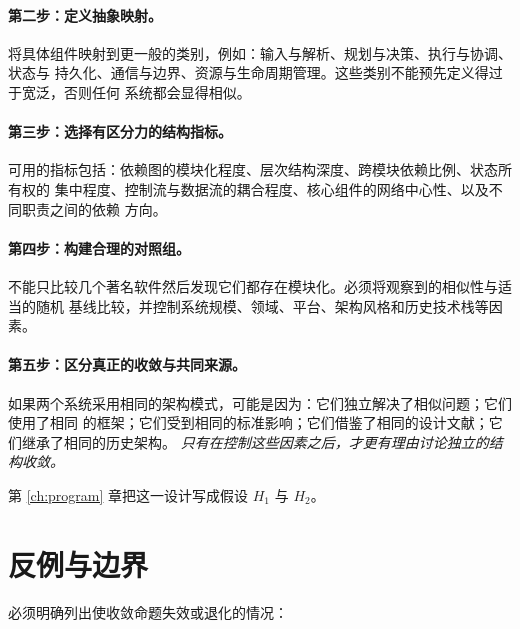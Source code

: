 \paragraph{第二步：定义抽象映射。}
将具体组件映射到更一般的类别，例如：输入与解析、规划与决策、执行与协调、状态与
持久化、通信与边界、资源与生命周期管理。这些类别不能预先定义得过于宽泛，否则任何
系统都会显得相似。

\paragraph{第三步：选择有区分力的结构指标。}
可用的指标包括：依赖图的模块化程度、层次结构深度、跨模块依赖比例、状态所有权的
集中程度、控制流与数据流的耦合程度、核心组件的网络中心性、以及不同职责之间的依赖
方向。

\paragraph{第四步：构建合理的对照组。}
不能只比较几个著名软件然后发现它们都存在模块化。必须将观察到的相似性与适当的随机
基线比较，并控制系统规模、领域、平台、架构风格和历史技术栈等因素。

\paragraph{第五步：区分真正的收敛与共同来源。}
如果两个系统采用相同的架构模式，可能是因为：它们独立解决了相似问题；它们使用了相同
的框架；它们受到相同的标准影响；它们借鉴了相同的设计文献；它们继承了相同的历史架构。
\emph{只有在控制这些因素之后，才更有理由讨论独立的结构收敛。}

第 \ref{ch:program} 章把这一设计写成假设 $H_1$ 与 $H_2$。

\section{反例与边界}\label{sec:limits}

必须明确列出使收敛命题失效或退化的情况：

